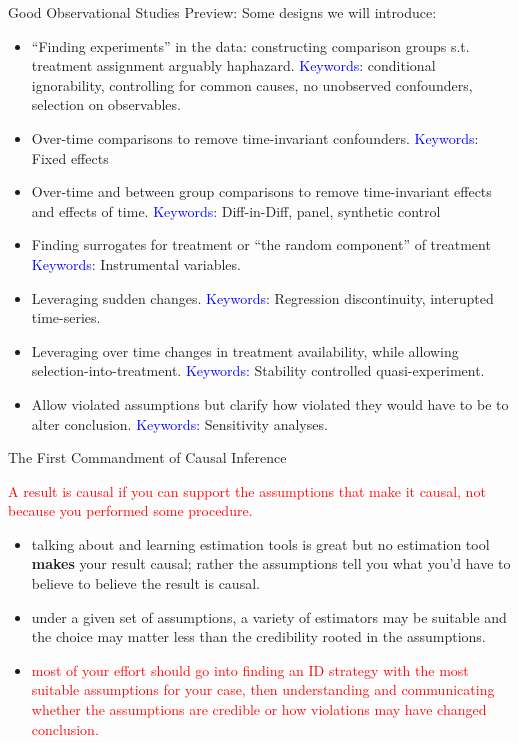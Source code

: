 \documentclass[xcolor=dvipsnames]{beamer}
\begin{document}
\begin{frame}{Good Observational Studies}
\alert{Preview:} Some designs we will introduce:
\bigskip
\footnotesize
\begin{itemize}
\item<1-> ``Finding experiments'' in the data: constructing comparison groups s.t. treatment assignment arguably haphazard.  \textcolor{Blue}{Keywords}:  conditional ignorability, controlling for common causes, no unobserved confounders, selection on observables.   
\medskip
\item<2-> Over-time comparisons to remove time-invariant confounders. \textcolor{Blue}{Keywords}: Fixed effects
\medskip
\item<3-> Over-time and between group comparisons to remove time-invariant effects and effects of time. \textcolor{Blue}{Keywords}: Diff-in-Diff, panel, synthetic control  \medskip
\item<4-> Finding surrogates for treatment or ``the random component'' of treatment \textcolor{Blue}{Keywords}: Instrumental variables.
\medskip
\item<5-> Leveraging sudden changes. \textcolor{Blue}{Keywords}: Regression discontinuity, interupted time-series. \medskip
\item<6-> Leveraging over time changes in treatment availability, while allowing selection-into-treatment. \textcolor{Blue}{Keywords:} Stability controlled quasi-experiment.
\medskip
\item<6-> Allow violated assumptions but clarify how violated they would have to be to alter conclusion. \textcolor{Blue}{Keywords:} Sensitivity analyses.
\end{itemize}
\end{frame}

\begin{frame}{The First Commandment of Causal Inference}

\begin{center}
\textcolor{Red}{A result is causal if you can support the assumptions that make it causal, not because you performed some procedure.}
\end{center}

\bigskip
\footnotesize
\begin{itemize}
\item talking about and learning estimation tools is great but no estimation tool \textbf{makes} your result causal; rather the assumptions tell you what you'd have to believe to believe the result is causal.
\item under a given set of assumptions, a variety of estimators may be suitable and the choice may matter less than the credibility rooted in the assumptions.
\item \textcolor{Red}{most of your effort should go into finding an ID strategy with the most suitable assumptions for your case, then understanding and communicating whether the assumptions are credible or how violations may have changed conclusion.}
\end{itemize}
\end{frame}
\end{document}
